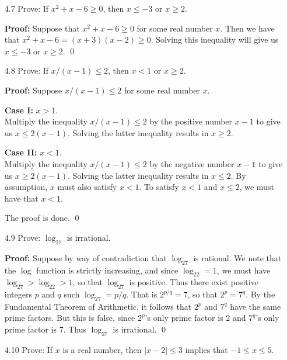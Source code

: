 \begin{enumerate}
		\textbf{Proof:} Let $x$ be a real number greater than 1. So choose
		$$y = 3x - 3\sqrt{x^2 - 1} \text{ and } z = 3x + 3\sqrt{x^2 - 1}.$$
		It is routine to check that $y$ and $z$ satisfy the required equations.
		\qed
   \item[4.7] Prove: If $x^2 + x - 6 \ge 0$, then $x \le -3$ or $x \ge 2$.
	
		\textbf{Proof:} Suppose that $x^2 + x - 6 \ge 0$ for some real number $x$.
		Then we have that $x^2 + x - 6 = (x + 3)(x - 2)\ge 0$. Solving this
		inequality will give us $x \le -3$ or $x \ge 2$. \qed
   \item[4.8] Prove: If $x/(x - 1) \le 2$, then $x < 1$ or $x \ge 2$.
	
		\textbf{Proof:} Suppose $x/(x - 1) \le 2$ for some real number $x$.
		
		\textbf{Case I:} $x > 1$. \\
		Multiply the inequality $x/(x - 1) \le 2$ by the positive number $x - 1$
		to give us $x \le 2(x - 1)$. Solving the latter inequality results in
		$x \ge 2$.
		
		\textbf{Case II:} $x < 1$. \\
		Multiply the inequality $x/(x - 1) \le 2$ by the negative number $x - 1$
		to give us $x \ge 2(x - 1)$. Solving the latter inequality results in
		$x \le 2$. By assumption, $x$ must also satisfy $x < 1$. To satisfy
		$x < 1$ and $x \le 2$, we must have that $x < 1$.
		
		The proof is done. \qed
   \item[4.9] Prove: $\log_27$ is irrational.
	
		\textbf{Proof:} Suppose by way of contradiction that $\log_27$ is
		rational. We note that the $\log$ function is strictly increasing, and
		since $\log_22 = 1$, we must have $\log_27 > \log_22 > 1$, so that
		$\log_27$ is positive. Thus there exist positive integers $p$ and $q$
		such $\log_27 = p/q$. That is $2^{p/q} = 7$, so that $2^p = 7^q$. By the
		Fundamental Theorem of Arithmetic, it follows that $2^p$ and $7^q$ have
		the same prime factors. But this is false, since $2^p$'s only prime factor
		is 2 and $7^q$'s only prime factor is 7. Thus $\log_27$ is irrational.
		\qed
   \item[4.10] Prove: If $x$ is a real number, then $|x - 2| \le 3$ implies that
               $-1 \le x \le 5$.
					

\end{enumerate}
